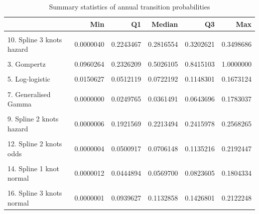 \documentclass[
]{article}
\begin{document}
\begin{table}
\caption{\label{tab:validate_extrapolation2}Summary statistics of annual transition probabilities}
\begin{tabular}[t]{lrrrrr}
\toprule
  & Min & Q1 & Median & Q3 & Max\\
\midrule
\cellcolor{gray!6}{1. Exponential} & \cellcolor{gray!6}{0.1278820} & \cellcolor{gray!6}{0.1278820} & \cellcolor{gray!6}{0.1278820} & \cellcolor{gray!6}{0.1278820} & \cellcolor{gray!6}{0.1278820}\\
10. Spline 3 knots hazard & 0.0000040 & 0.2243467 & 0.2816554 & 0.3202621 & 0.3498686\\
\cellcolor{gray!6}{2. Weibull} & \cellcolor{gray!6}{0.0298491} & \cellcolor{gray!6}{0.2382194} & \cellcolor{gray!6}{0.2998675} & \cellcolor{gray!6}{0.3413164} & \cellcolor{gray!6}{0.3730304}\\
3. Gompertz & 0.0960264 & 0.2326209 & 0.5026105 & 0.8415103 & 1.0000000\\
\cellcolor{gray!6}{4. Log-normal} & \cellcolor{gray!6}{0.0004751} & \cellcolor{gray!6}{0.0692201} & \cellcolor{gray!6}{0.0864990} & \cellcolor{gray!6}{0.1175437} & \cellcolor{gray!6}{0.1630482}\\
5. Log-logistic & 0.0150627 & 0.0512119 & 0.0722192 & 0.1148301 & 0.1673124\\
\cellcolor{gray!6}{6. Gamma} & \cellcolor{gray!6}{0.0159374} & \cellcolor{gray!6}{0.2105278} & \cellcolor{gray!6}{0.2273428} & \cellcolor{gray!6}{0.2338793} & \cellcolor{gray!6}{0.2373538}\\
7. Generalised Gamma & 0.0000000 & 0.0249765 & 0.0361491 & 0.0643696 & 0.1783037\\
\cellcolor{gray!6}{8. Spline 1 knot hazard} & \cellcolor{gray!6}{0.0005533} & \cellcolor{gray!6}{0.0961200} & \cellcolor{gray!6}{0.1007177} & \cellcolor{gray!6}{0.1087714} & \cellcolor{gray!6}{0.1767370}\\
9. Spline 2 knots hazard & 0.0000006 & 0.1921569 & 0.2213494 & 0.2415978 & 0.2568265\\
\cellcolor{gray!6}{11. Spline 1 knot odds} & \cellcolor{gray!6}{0.0004610} & \cellcolor{gray!6}{0.0331955} & \cellcolor{gray!6}{0.0461415} & \cellcolor{gray!6}{0.0743721} & \cellcolor{gray!6}{0.1809477}\\
12. Spline 2 knots odds & 0.0000004 & 0.0500917 & 0.0706148 & 0.1135216 & 0.2192447\\
\cellcolor{gray!6}{13. Spline 3 knots odds} & \cellcolor{gray!6}{0.0000052} & \cellcolor{gray!6}{0.0581364} & \cellcolor{gray!6}{0.0821832} & \cellcolor{gray!6}{0.1255993} & \cellcolor{gray!6}{0.2117141}\\
14. Spline 1 knot normal & 0.0000012 & 0.0444894 & 0.0569700 & 0.0823605 & 0.1804334\\
\cellcolor{gray!6}{15. Spline 2 knots normal} & \cellcolor{gray!6}{0.0000000} & \cellcolor{gray!6}{0.0682231} & \cellcolor{gray!6}{0.0852159} & \cellcolor{gray!6}{0.1164045} & \cellcolor{gray!6}{0.2005479}\\
16. Spline 3 knots normal & 0.0000001 & 0.0939627 & 0.1132858 & 0.1426801 & 0.2122248\\
\bottomrule
\end{tabular}
\end{table}
\end{document}

